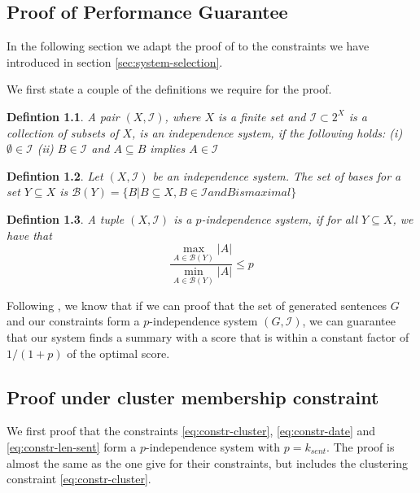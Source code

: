 \documentclass[a4paper,BCOR=10mm]{report}
\numberwithin{lemma}{chapter}
\newtheorem{definition}{Defintion}
\numberwithin{definition}{chapter}
\begin{document}
\begin{appendices}
\chapter{Proof of Performance Guarantee}

In the following section we adapt the proof of \citet{markert} to the constraints we have introduced in section \ref{sec:system-selection}.

We first state a couple of the definitions we require for the proof.

\begin{definition}
A pair $(X, \mathcal{I})$, where $X$ is a finite set and $\mathcal{I} \subset 2^X$ is a collection of subsets of $X$, is an independence system, if the following holds: (i) $\emptyset \in \mathcal{I}$ (ii) $B \in \mathcal{I}$ and $A \subseteq B$ implies $A \in \mathcal{I}$
\end{definition}

\begin{definition}
Let $(X, \mathcal{I})$ be an independence system. The set of bases for a set $Y \subseteq X$ is $\mathcal{B}(Y) = \{B | B \subseteq X, B \in \mathcal{I} \mathit{ and } B \mathit{ is maximal} \}$
\end{definition}


\begin{definition}
A tuple $(X, \mathcal{I})$ is a $p$-independence system, if for all $Y \subseteq X$, we have that
\begin{equation}
 \frac{\max_{A \in \mathcal{B}(Y)} |A|}{\min_{A \in \mathcal{B}(Y)} |A|} \leq p
\end{equation}
\end{definition}

Following \citet{markert}, we know that if we can proof that the set of generated sentences $G$ and our constraints form a $p$-independence system $(G, \mathcal{I})$, we can guarantee that our system finds a summary with a score that is within a constant factor of $1 / (1 + p)$ of the optimal score.

\section{Proof under cluster membership constraint}

We first proof that the constraints \ref{eq:constr-cluster}, \ref{eq:constr-date} and \ref{eq:constr-len-sent} form a $p$-independence system with $p = k_{sent}$.
The proof is almost the same as the one \citet{markert} give for their constraints, but includes the clustering constraint \ref{eq:constr-cluster}.


\end{appendices}
\end{document}
